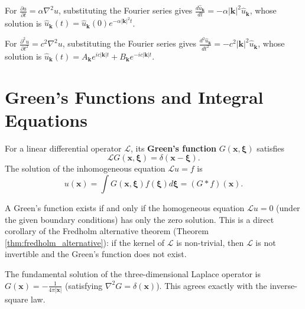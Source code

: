 \begin{example}\label{ex:heat_fourier}
For $\frac{\partial u}{\partial t} = \alpha \nabla^2 u$, substituting the Fourier series gives $\frac{d \hat{u}_{\mathbf{k}}}{dt} = -\alpha |\mathbf{k}|^2 \hat{u}_{\mathbf{k}}$, whose solution is $\hat{u}_{\mathbf{k}}(t) = \hat{u}_{\mathbf{k}}(0) e^{-\alpha |\mathbf{k}|^2 t}$.
\end{example}

\begin{example}\label{ex:wave_fourier}
For $\frac{\partial^2 u}{\partial t^2} = c^2 \nabla^2 u$, substituting the Fourier series gives $\frac{d^2 \hat{u}_{\mathbf{k}}}{dt^2} = -c^2 |\mathbf{k}|^2 \hat{u}_{\mathbf{k}}$, whose solution is $\hat{u}_{\mathbf{k}}(t) = A_{\mathbf{k}} e^{i c |\mathbf{k}| t} + B_{\mathbf{k}} e^{-i c |\mathbf{k}| t}$.
\end{example}

\section{Green's Functions and Integral Equations}\label{sec:green_integral}

\begin{definition}\label{def:green_function}
For a linear differential operator $\mathcal{L}$, its \textbf{Green's function} $G(\mathbf{x}, \boldsymbol{\xi})$ satisfies
\[
\mathcal{L} G(\mathbf{x}, \boldsymbol{\xi}) = \delta(\mathbf{x} - \boldsymbol{\xi}).
\]
The solution of the inhomogeneous equation $\mathcal{L} u = f$ is
\[
u(\mathbf{x}) = \int G(\mathbf{x}, \boldsymbol{\xi}) f(\boldsymbol{\xi}) d\boldsymbol{\xi} = (G * f)(\mathbf{x}).
\]
\end{definition}

\begin{remark}\label{rem:green_existence}
A Green's function exists if and only if the homogeneous equation $\mathcal{L} u = 0$ (under the given boundary conditions) has only the zero solution. This is a direct corollary of the Fredholm alternative theorem (Theorem \ref{thm:fredholm_alternative}): if the kernel of $\mathcal{L}$ is non-trivial, then $\mathcal{L}$ is not invertible and the Green's function does not exist.
\end{remark}

\begin{example}\label{ex:laplace_green}
The fundamental solution of the three-dimensional Laplace operator is $G(\mathbf{x}) = -\frac{1}{4\pi |\mathbf{x}|}$ (satisfying $\nabla^2 G = \delta(\mathbf{x})$). This agrees exactly with the inverse-square law.
\end{example}

